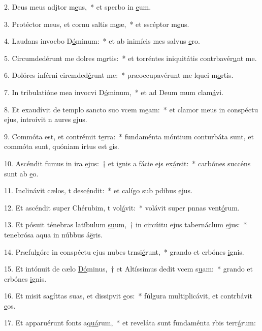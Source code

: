 2. Deus meus adjtor m\uline{e}us,~* et sperbo in \uline{e}um.\par 
3. Protéctor meus, et cornu saltis m\uline{e}æ,~* et sscéptor m\uline{e}us.\par 
4. Laudans invocbo D\uline{ó}minum:~* et ab inimícis mes salvus \uline{e}ro.\par 
5. Circumdedérunt me dolres m\uline{o}rtis:~* et torréntes iniquitátis contrbavér\uline{u}nt me.\par 
6. Dolóres inférni circmded\uline{é}runt me:~* præoccupavérunt me lquei m\uline{o}rtis.\par 
7. In tribulatióne mea invocvi D\uline{ó}minum,~* et ad Deum mum clam\uline{á}vi.\par 
8. Et exaudívit de templo sancto suo vcem m\uline{e}am:~* et clamor meus in conspéctu ejus, introívit n aures \uline{e}jus.\par 
9. Commóta est, et contrémit t\uline{e}rra:~* fundaménta móntium conturbáta sunt, et commóta sunt, quóniam irtus est \uline{e}is.\par 
10. Ascéndit fumus in ira \uline{e}jus:~† et ignis a fácie ejs ex\uline{á}rsit:~* carbónes succéns sunt ab \uline{e}o.\par 
11. Inclinávit cælos, t desc\uline{é}ndit:~* et calígo sub pdibus \uline{e}jus.\par 
12. Et ascéndit super Chérubim, t vol\uline{á}vit:~* volávit super pnnas vent\uline{ó}rum.\par 
13. Et pósuit ténebras latíbulum \uline{su}um,~† in circúitu ejus tabernáclum \uline{e}jus:~* tenebrósa aqua in núbbus á\uline{ë}ris.\par 
14. Præfulgóre in conspéctu ejus nubes trnsi\uline{é}runt,~* grando et crbónes \uline{i}gnis.\par 
15. Et intónuit de cælo \uline{Dó}minus,~† et Altíssimus dedit vcem s\uline{u}am:~* grando et crbónes \uline{i}gnis.\par 
16. Et misit sagíttas suas, et dissipvit \uline{e}os:~* fúlgura multiplicávit, et contrbávit \uline{e}os.\par 
17. Et apparuérunt fonts a\uline{quá}rum,~* et reveláta sunt fundaménta rbis terr\uline{á}rum:\par 
